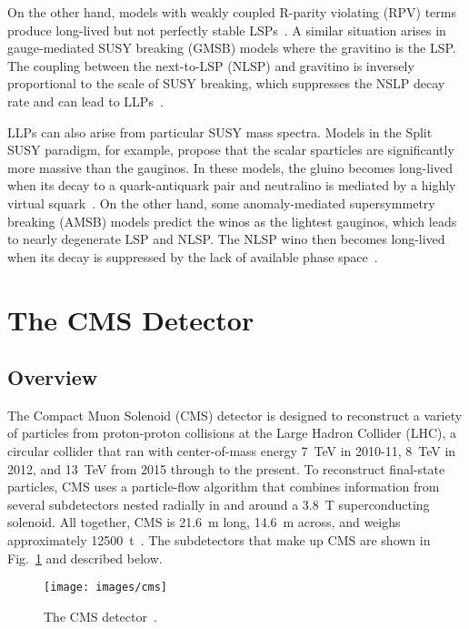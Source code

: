 \documentclass[12pt]{article}
\begin{document}
    On the other hand, models with weakly coupled R-parity violating (RPV) terms produce long-lived but not perfectly stable LSPs~\cite{fate}. A similar situation arises in gauge-mediated SUSY breaking (GMSB) models where the gravitino is the LSP. The coupling between the next-to-LSP (NLSP) and gravitino is inversely proportional to the scale of SUSY breaking, which suppresses the NSLP decay rate and can lead to LLPs~\cite{dimopoulos_low_energy}.

    LLPs can also arise from particular SUSY mass spectra. Models in the Split SUSY paradigm, for example, propose that the scalar sparticles are significantly more massive than the gauginos. In these models, the gluino becomes long-lived when its decay to a quark-antiquark pair and neutralino is mediated by a highly virtual squark~\cite{kilian_split}. On the other hand, some anomaly-mediated supersymmetry breaking (AMSB) models predict the winos as the lightest gauginos, which leads to nearly degenerate LSP and NLSP. The NLSP wino then becomes long-lived when its decay is suppressed by the lack of available phase space~\cite{randall_sundrum_out_of_this_world}.

\section{The CMS Detector}
    \subsection{Overview}
        The Compact Muon Solenoid (CMS) detector is designed to reconstruct a variety of particles from proton-proton collisions at the Large Hadron Collider (LHC), a circular collider that ran with center-of-mass energy \SI{7}{\tera\electronvolt} in 2010-11, \SI{8}{\tera\electronvolt} in 2012, and \SI{13}{\tera\electronvolt} from 2015 through to the present. To reconstruct final-state particles, CMS uses a particle-flow algorithm that combines information from several subdetectors nested radially in and around a \SI{3.8}{\tesla} superconducting solenoid. All together, CMS is \SI{21.6}{\m} long, \SI{14.6}{\m} across, and weighs approximately \SI{12500}{t}~\cite{cms_experiment}. The subdetectors that make up CMS are shown in Fig.~\ref{cms} and described below.

        \noindent \begin{figure}[htbp] \begin{center}
        \texttt{[image: images/cms]}
        \caption{The CMS detector~\cite{cms_image}.}
        \label{cms}
        \end{center} \end{figure}
\end{document}
